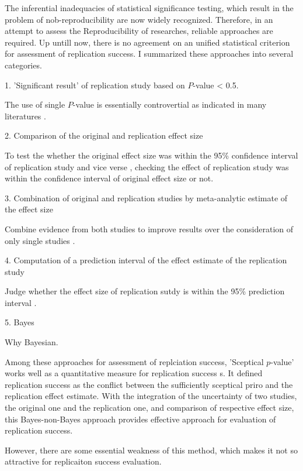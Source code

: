 \documentclass[11pt,a4paper,twoside]{book}\usepackage[]{graphicx}\usepackage[]{color}
\begin{document}
The inferential inadequacies of statistical significance testing, which result in the problem of nob-reproducibility are now widely recognized. Therefore, in an attempt to assess the Reproducibility of researches, reliable approaches are required. Up untill now, there is no agreement on an unified statistical criterion for assessment of replication success. I summarized these approaches into several categories.

1. 'Significant result' of replication study based on $P$-value < 0.5.

The use of single $P$-value is essentially controvertial as indicated in many literatures \citep{benjamin2018redefine, amrhein2018remove}. 
   
2. Comparison of the original and replication effect size

To test the whether the original effect size was within the 95\% confidence interval of replication study \citep{} and vice verse , checking the effect of replication study was within the confidence interval of original effect size or not\citep{patil2016should, opensicence }.

3. Combination of original and replication studies by meta-analytic estimate of the effect size

Combine evidence from both studies to improve results over the consideration of only single studies \citep{braver2014continuously}.

4. Computation of a prediction interval of the effect estimate of the replication study

Judge whether the effect size of replication sutdy is within the 95\% prediction interval \citep{patil2016should}.

5. Bayes 

Why Bayesian.


Among these approaches for assessment of replciation success, 'Sceptical $p$-value' works well as a quantitative measure for replication success s\citep{held2018new}. It defined replication success as the conflict between the sufficiently sceptical priro and the replication effect estimate. With the integration of the uncertainty of two studies, the original one and the replication one, and comparison of respective effect size, this Bayes-non-Bayes approach provides effective approach for evaluation of replication success.

However, there are some essential weakness of this method, which makes it not so attractive for replicaiton success evaluation.
\end{document}
